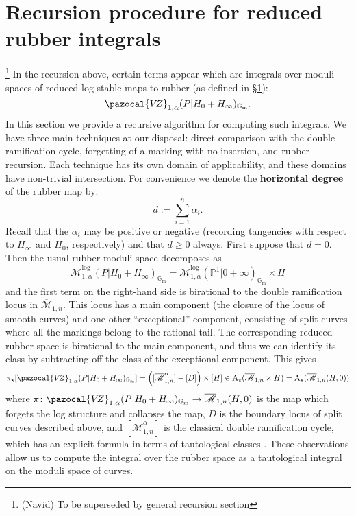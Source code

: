 \documentclass[11pt]{amsart}
\newcommand{\MLog}{\overline{\mathcal{M}}^{\operatorname{log}}}
\newcommand{\PP}{\mathbb P}
\newcommand{\VZ}{\pazocal{V\!Z}}
\newcommand{\st}{\star}
\renewcommand{\to}{\rightarrow}
\newcommand{\Gm}{\mathbb{G}_{\text{m}}}
\newcommand{\Achow}{\operatorname{A}}
\newcommand{\Mcal}{\mathcal{M}}
\newcommand{\ol}[1]{\overline{#1}}
\theoremstyle{definition}
\theoremstyle{definition}
\begin{document}
\section{Recursion procedure for reduced rubber integrals} \footnote{(Navid) To be superseded by general recursion section} In the recursion above, certain terms appear which are integrals over moduli spaces of reduced log stable maps to rubber (as defined in \S \ref{}):
\begin{equation*}\VZ_{1,\alpha}(P|H_0+H_\infty)_{\Gm}.\end{equation*}
In this section we provide a recursive algorithm for computing such integrals. We have three main techniques at our disposal: direct comparison with the double ramification cycle, forgetting of a marking with no insertion, and rubber recursion. Each technique has its own domain of applicability, and these domains have non-trivial intersection. For convenience we denote the \textbf{horizontal degree} of the rubber map by:
\begin{equation*} d := \sum_{i=1}^n \alpha_i .\end{equation*}
Recall that the $\alpha_i$ may be positive or negative (recording tangencies with respect to $H_\infty$ and $H_0$, respectively) and that $d \geq 0$ always. First suppose that $d=0$. Then the usual rubber moduli space decomposes as
\begin{equation*} \MLog_{1,\alpha}(P|H_0 + H_\infty)_{\Gm} = \MLog_{1,\alpha}(\PP^1|0+\infty)_{\Gm} \times H \end{equation*}
and the first term on the right-hand side is birational to the double ramification locus in $\ol\Mcal_{1,n}$. This locus has a main component (the closure of the locus of smooth curves) and one other ``exceptional'' component, consisting of split curves where all the markings belong to the rational tail. The corresponding reduced rubber space is birational to the main component, and thus we can identify its class by subtracting off the class of the exceptional component. This gives
\begin{equation*} \pi_\st [\VZ_{1,\alpha}(P|H_0+H_\infty)_{\Gm}] = \left( [\ol\Mcal_{1,n}^\alpha] - [D] \right) \times [H] \in \Achow_\st ( \ol\Mcal_{1,n} \times H ) = \Achow_\st ( \ol\Mcal_{1,n}(H,0) ) \end{equation*}
where $\pi \colon \VZ_{1,\alpha}(P|H_0+H_\infty)_{\Gm} \to \ol\Mcal_{1,n}(H,0)$ is the map which forgets the log structure and collapses the map, $D$ is the boundary locus of split curves described above, and $[\ol\Mcal_{1,n}^\alpha]$ is the classical double ramification cycle, which has an explicit formula in terms of tautological classes \cite{Hain,JPPZ}. These observations allow us to compute the integral over the rubber space as a tautological integral on the moduli space of curves.
\end{document}
